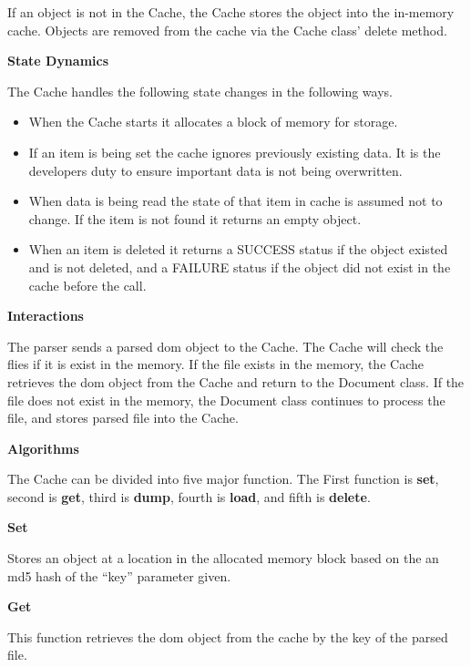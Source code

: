 If an object is not in the Cache, the Cache stores the object into the in-memory cache. 
Objects are removed from the cache via the Cache class' delete method.

\textbf{State Dynamics}

The Cache handles the following state changes in the following ways.

\begin{itemize}
    \item {
      When the Cache starts it allocates a block of memory for storage.
     }
    \item {
      If an item is being set the cache ignores previously existing data.
      It is the developers duty to ensure important data is not being overwritten.
    }
    \item {
      When data is being read the state of that item in cache is assumed not to change.
      If the item is not found it returns an empty object.
    }
    \item  When an item is deleted it returns a SUCCESS status if the object existed and is not deleted, and a FAILURE status if the object did not exist in the cache before the call.
\end{itemize}

\textbf{Interactions}

The parser sends a parsed \gls{dom} object to the Cache. 
The Cache will check the flies if it is exist in the memory. 
If the file exists in the memory, the Cache retrieves the \gls{dom} object from the Cache and return to the Document class. 
If the file does not exist in the memory, the Document class continues to process the file, and stores parsed file into the Cache.

\textbf{Algorithms}

The Cache can be divided into five major function.
The First function is \textbf{set}, second is \textbf{get}, third is \textbf{dump}, fourth is \textbf{load}, and fifth is \textbf{delete}.

\textbf{Set}

Stores an object at a location in the allocated memory block based on the an \gls{md5} hash of the ``key'' parameter given.

\textbf{Get}

This function retrieves the \gls{dom} object from the cache by the key of the parsed file.

